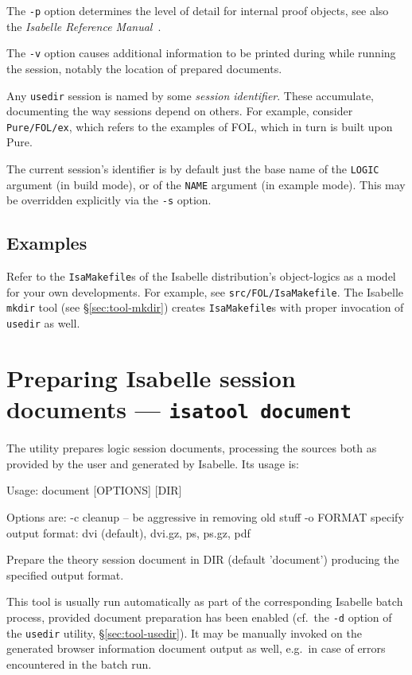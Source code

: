 \medskip The \texttt{-p} option determines the level of detail for internal
proof objects, see also the \emph{Isabelle Reference
  Manual}~\cite{isabelle-ref}.

\medskip The \texttt{-v} option causes additional information to be printed
during while running the session, notably the location of prepared documents.

\medskip Any \texttt{usedir} session is named by some \emph{session
  identifier}. These accumulate, documenting the way sessions depend on
others. For example, consider \texttt{Pure/FOL/ex}, which refers to the
examples of FOL, which in turn is built upon Pure.

The current session's identifier is by default just the base name of the
\texttt{LOGIC} argument (in build mode), or of the \texttt{NAME} argument (in
example mode). This may be overridden explicitly via the \texttt{-s} option.


\subsection*{Examples}

Refer to the \texttt{IsaMakefile}s of the Isabelle distribution's
object-logics as a model for your own developments.  For example, see
\texttt{src/FOL/IsaMakefile}.  The Isabelle \texttt{mkdir} tool (see
\S\ref{sec:tool-mkdir}) creates \texttt{IsaMakefile}s with proper invocation
of \texttt{usedir} as well.


\section{Preparing Isabelle session documents --- \texttt{isatool document}}
\label{sec:tool-document}

The  utility prepares logic session documents, processing the
sources both as provided by the user and generated by Isabelle.  Its usage is:
\begin{ttbox}
Usage: document [OPTIONS] [DIR]

  Options are:
    -c           cleanup -- be aggressive in removing old stuff
    -o FORMAT    specify output format: dvi (default), dvi.gz, ps,
                 ps.gz, pdf

  Prepare the theory session document in DIR (default 'document')
  producing the specified output format.
\end{ttbox}
This tool is usually run automatically as part of the corresponding Isabelle
batch process, provided document preparation has been enabled (cf.\ the
\texttt{-d} option of the \texttt{usedir} utility, \S\ref{sec:tool-usedir}).
It may be manually invoked on the generated browser information document
output as well, e.g.\ in case of errors encountered in the batch run.

